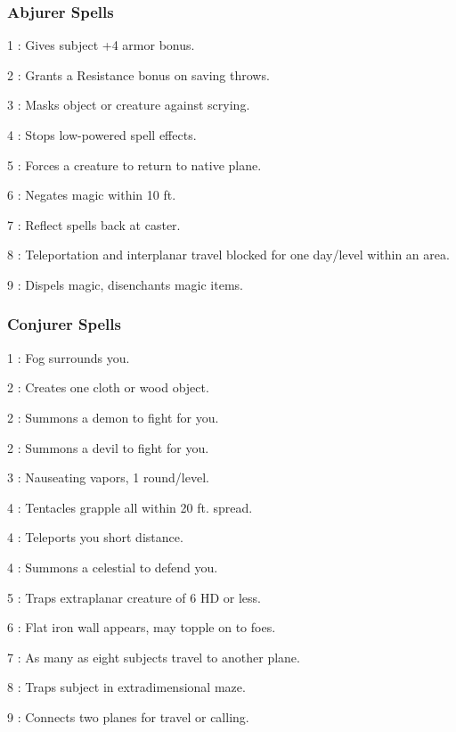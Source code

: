 \subsubsection{Abjurer Spells}
\begin{list}{}{\leftmargin=1em}
\item[1] : Gives subject +4 armor bonus.
\item[2]  : Grants a Resistance bonus on saving throws.
\item[3] : Masks object or creature against scrying.
\item[4] : Stops low-powered spell effects.
\item[5] : Forces a creature to return to native plane.
\item[6] : Negates magic within 10 ft.
\item[7] : Reflect spells back at caster.
\item[8] : Teleportation and interplanar travel blocked for one day/level within an area.
\item[9] : Dispels magic, disenchants magic items.
\end{list}
\subsubsection{Conjurer Spells}
\begin{list}{}{\leftmargin=1em}
\item[1] : Fog surrounds you.
\item[2] : Creates one cloth or wood object.
\item[2] : Summons a demon to fight for you.
\item[2] : Summons a devil to fight for you.
\item[3] : Nauseating vapors, 1 round/level.
\item[4] : Tentacles grapple all within 20 ft. spread.
\item[4] : Teleports you short distance.
\item[4] : Summons a celestial to defend you.
\item[5] : Traps extraplanar creature of 6 HD or less.
\item[6] : Flat iron wall appears, may topple on to foes.
\item[7] : As many as eight subjects travel to another plane.
\item[8] : Traps subject in extradimensional maze.
\item[9] : Connects two planes for travel or calling.
\end{list}

